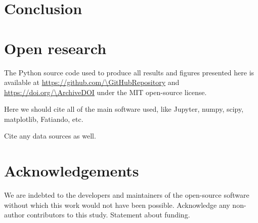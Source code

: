 \section{Conclusion}



\section{Open research}

The Python source code used to produce all results and figures presented here
is available at \url{https://github.com/\GitHubRepository} and
\url{https://doi.org/\ArchiveDOI} under the MIT open-source license.

Here we should cite all of the main software used, like Jupyter, numpy, scipy,
matplotlib, Fatiando, etc.

Cite any data sources as well.



\section{Acknowledgements}

We are indebted to the developers and maintainers of the open-source software
without which this work would not have been possible.
Acknowledge any non-author contributors to this study.
Statement about funding.

